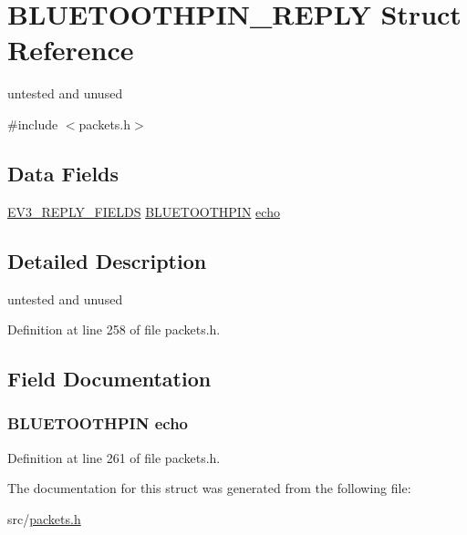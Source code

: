 \hypertarget{struct_b_l_u_e_t_o_o_t_h_p_i_n___r_e_p_l_y}{}\section{B\+L\+U\+E\+T\+O\+O\+T\+H\+P\+I\+N\+\_\+\+R\+E\+P\+L\+Y Struct Reference}
\label{struct_b_l_u_e_t_o_o_t_h_p_i_n___r_e_p_l_y}


untested and unused  




{\ttfamily \#include $<$packets.\+h$>$}

\subsection*{Data Fields}
\begin{DoxyCompactItemize}
\item 
\hyperlink{packets_8h_a382c165d520d462ac8f0c88e2a1970cb}{E\+V3\+\_\+\+R\+E\+P\+L\+Y\+\_\+\+F\+I\+E\+L\+D\+S} \hyperlink{packets_8h_ac3a1ac8c2841ebbffc2c5b6aa98a167f}{B\+L\+U\+E\+T\+O\+O\+T\+H\+P\+I\+N} \hyperlink{struct_b_l_u_e_t_o_o_t_h_p_i_n___r_e_p_l_y_a8d07e741a40e15d64742a8cd763227b0}{echo}
\end{DoxyCompactItemize}


\subsection{Detailed Description}
untested and unused 

Definition at line 258 of file packets.\+h.



\subsection{Field Documentation}
\hypertarget{struct_b_l_u_e_t_o_o_t_h_p_i_n___r_e_p_l_y_a8d07e741a40e15d64742a8cd763227b0}{}
\subsubsection[{echo}]{ {\bf B\+L\+U\+E\+T\+O\+O\+T\+H\+P\+I\+N} echo}\label{struct_b_l_u_e_t_o_o_t_h_p_i_n___r_e_p_l_y_a8d07e741a40e15d64742a8cd763227b0}


Definition at line 261 of file packets.\+h.



The documentation for this struct was generated from the following file\+:\begin{DoxyCompactItemize}
\item 
src/\hyperlink{packets_8h}{packets.\+h}\end{DoxyCompactItemize}

